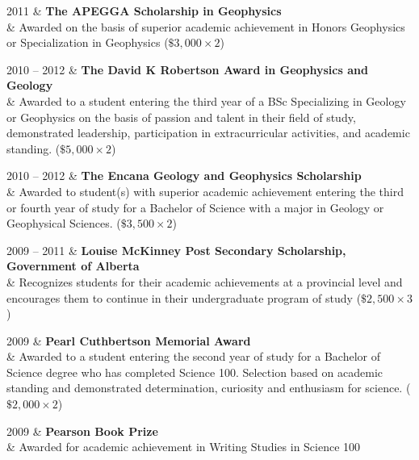 \documentclass[a4paper, 11pt]{article}
\begin{document}
\begin{entryright}
2011 & \textbf{The APEGGA Scholarship in Geophysics} \\
& Awarded on the basis of superior academic achievement in Honors Geophysics or Specialization in Geophysics ($\$3,000 \times 2$)
\end{entryright}

\begin{entryright}
2010 -- 2012 & \textbf{The David K Robertson Award in Geophysics and Geology} \\
& Awarded to a student entering the third year of a BSc Specializing in Geology or Geophysics on the basis of passion and talent in their field of study, demonstrated leadership, participation in extracurricular activities, and academic standing. ($\$5,000 \times 2$)
\end{entryright}

\begin{entryright}
2010 -- 2012 & \textbf{The Encana Geology and Geophysics Scholarship} \\
& Awarded to student(s) with superior academic achievement entering the third or fourth year of study for a Bachelor of Science with a major in Geology or Geophysical Sciences. ($\$3,500 \times 2$)
\end{entryright}

\begin{entryright}
2009 -- 2011 & \textbf{Louise McKinney Post Secondary Scholarship, Government of Alberta} \\
& Recognizes students for their academic achievements at a provincial level and encourages them to continue in their undergraduate program of study ($\$2,500 \times 3$)
\end{entryright}

\begin{entryright}
2009 & \textbf{Pearl Cuthbertson Memorial Award} \\
& Awarded to a student entering the second year of study for a Bachelor of Science degree who has completed Science 100. Selection based on academic standing and demonstrated determination, curiosity and enthusiasm for science. ($\$2,000 \times 2$)
\end{entryright}

\begin{entryright}
2009 & \textbf{Pearson Book Prize}\\
& Awarded for academic achievement in Writing Studies in Science 100
\end{entryright}
\end{document}
